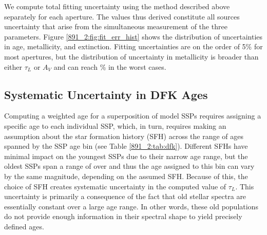 
We compute total fitting uncertainty using the method described above
separately for each aperture. The values thus derived constitute all
sources uncertainty that arise from the simultaneous measurement of
the three parameters. Figure \ref{891_2:fig:fit_err_hist} shows the
distribution of uncertainties in age, metallicity, and
extinction. Fitting uncertainties are on the order of 5\% for most
apertures, but the distribution of uncertainty in metallicity is
broader than either $\tau_L$ or $A_V$ and can reach \% in the
worst cases.



\subsection{Systematic Uncertainty in DFK Ages}
\label{891_2:sec:sys_err}

Computing a weighted age for a superposition of model SSPs requires
assigning a specific age to each individual SSP, which, in turn,
requires making an assumption about the star formation history (SFH)
across the range of ages spanned by the SSP age bin (see Table
\ref{891_2:tab:dfk}). Different SFHs have minimal impact on the youngest
SSPs due to their narrow age range, but the oldest SSPs span a range
of over  and thus the age assigned to this bin can vary by
the same magnitude, depending on the assumed SFH. Because of this, the
choice of SFH creates systematic uncertainty in the computed value of
$\tau_L$. This uncertainty is primarily a consequence of the fact that
old stellar spectra are essentially constant over a large age
range. In other words, these old populations do not provide enough
information in their spectral shape to yield precisely defined ages.


